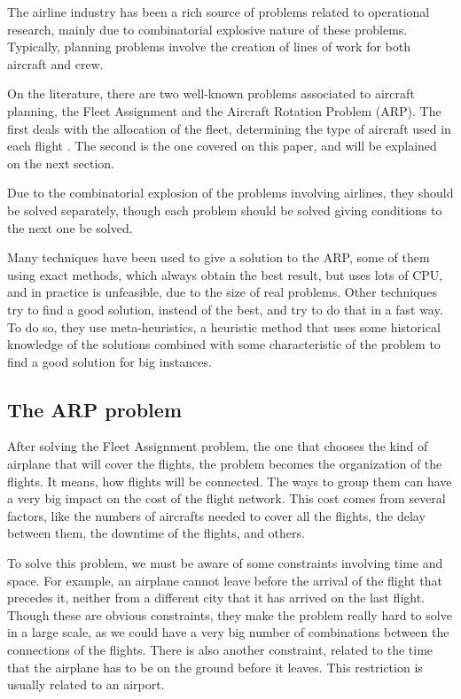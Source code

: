 \documentclass{endm}
\begin{document}
The airline industry has been a rich source of problems related to operational research, mainly due to combinatorial explosive nature of these problems. Typically, planning problems involve the creation of lines of work for both aircraft and crew.

On the literature, there are two well-known problems associated to aircraft planning, the Fleet Assignment and the Aircraft Rotation Problem (ARP). The first deals with the allocation of the fleet, determining the type of aircraft used in each flight \cite{pimentel2005}. The second is the one covered on this paper, and will be explained on the next section.

Due to the combinatorial explosion of the problems involving airlines, they should be solved separately, though each problem should be solved giving conditions to the next one be solved. 

Many techniques have been used to give a solution to the ARP, some of them using exact methods, which always obtain the best result, but uses lots of CPU, and in practice is unfeasible, due to the size of real problems. Other techniques try to find a good solution, instead of the best, and try to do that in a fast way. To do so, they use meta-heuristics, a heuristic method that uses some historical knowledge of the solutions combined with some characteristic of the problem to find a good solution for big instances.

\subsection{The ARP problem}

After solving the Fleet Assignment problem, the one that chooses the kind of airplane that will cover the flights, the problem becomes the organization of the flights. It means, how flights will be connected. The ways to group them can have a very big impact on the cost of the flight network. This cost comes from several factors, like the numbers of aircrafts needed to cover all the flights, the delay between them, the downtime of the flights, and others.

To solve this problem, we must be aware of some constraints involving time and space. For example, an airplane cannot leave before the arrival of the flight that precedes it, neither from a different city that it has arrived on the last flight. Though these are obvious constraints, they make the problem really hard to solve in a large scale, as we could have a very big number of combinations between the connections of the flights. There is also another constraint, related to the time that the airplane has to be on the ground before it leaves. This restriction is usually related to an airport.
\end{document}
